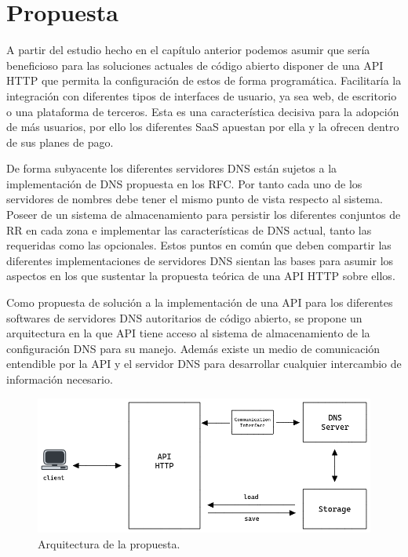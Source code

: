 \chapter{Propuesta}\label{chapter:proposal}

A partir del estudio hecho en el capítulo anterior podemos asumir que sería beneficioso para las soluciones actuales de código abierto disponer de una API HTTP que permita la configuración de estos de forma programática. Facilitaría la integración con diferentes tipos de interfaces de usuario, ya sea web, de escritorio o una plataforma de terceros. Esta es una característica decisiva para la adopción de más usuarios, por ello los diferentes SaaS apuestan por ella y la ofrecen dentro de sus planes de pago.

De forma subyacente los diferentes servidores DNS están sujetos a la implementación de DNS propuesta en los RFC. Por tanto cada uno de los servidores de nombres debe tener el mismo punto de vista respecto al sistema. Poseer de un sistema de almacenamiento para persistir los diferentes conjuntos de RR en cada zona e implementar las características de DNS actual, tanto las requeridas como las opcionales. Estos puntos en común que deben compartir las diferentes implementaciones de servidores DNS sientan las bases para asumir los aspectos en los que sustentar la propuesta teórica de una API HTTP sobre ellos.

Como propuesta de solución a la implementación de una API para los diferentes softwares de servidores DNS autoritarios de código abierto, se propone un arquitectura en la que API tiene acceso al sistema de almacenamiento de la configuración DNS para su manejo. Además existe un medio de comunicación entendible por la API y el servidor DNS para desarrollar cualquier intercambio de información necesario.

\begin{figure}[!ht]
    \centering
    \includegraphics[width=\linewidth]{draws/proposal.png}
    \caption{Arquitectura de la propuesta.}
\end{figure}

